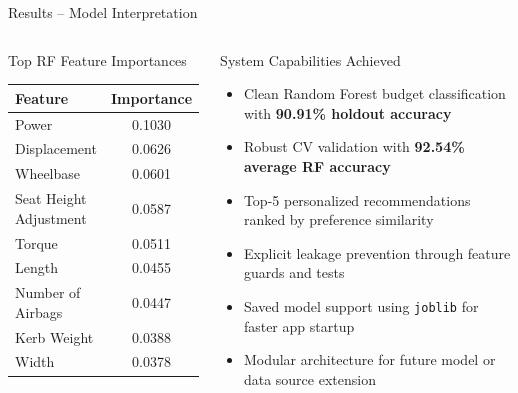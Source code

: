 \documentclass[aspectratio=169]{beamer}
\begin{document}
\begin{frame}{Results -- Model Interpretation}
  \begin{columns}[t]
      \begin{block}{Top RF Feature Importances}
        \vspace{0.3em}
        \begin{tabular}{lc}
          \toprule
          \textbf{Feature} & \textbf{Importance} \\
          \midrule
          Power & 0.1030 \\
          Displacement & 0.0626 \\
          Wheelbase & 0.0601 \\
          Seat Height Adjustment & 0.0587 \\
          Torque & 0.0511 \\
          Length & 0.0455 \\
          Number of Airbags & 0.0447 \\
          Kerb Weight & 0.0388 \\
          Width & 0.0378 \\
          \bottomrule
        \end{tabular}
      \end{block}

      \begin{block}{System Capabilities Achieved}
        \begin{itemize}
          \setlength\itemsep{0.4em}
          \item Clean Random Forest budget classification with \textbf{90.91\% holdout accuracy}
          \item Robust CV validation with \textbf{92.54\% average RF accuracy}
          \item Top-5 personalized recommendations ranked by preference similarity
          \item Explicit leakage prevention through feature guards and tests
          \item Saved model support using \texttt{joblib} for faster app startup
          \item Modular architecture for future model or data source extension
        \end{itemize}
      \end{block}
  \end{columns}
\end{frame}

\end{document}
